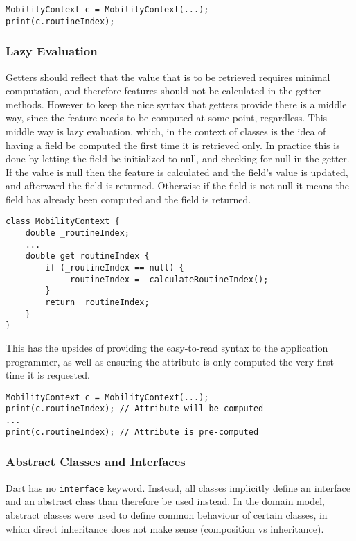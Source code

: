 \begin{verbatim}
MobilityContext c = MobilityContext(...);
print(c.routineIndex);
\end{verbatim}

\subsubsection{Lazy Evaluation}
Getters should reflect that the value that is to be retrieved requires minimal computation, and therefore features should not be calculated in the getter methods. However to keep the nice syntax that getters provide there is a middle way, since the feature needs to be computed at some point, regardless. This middle way is lazy evaluation, which, in the context of classes is the idea of having a field be computed the first time it is retrieved only. In practice this is done by letting the field be initialized to null, and checking for null in the getter. If the value is null then the feature is calculated and the field's value is updated, and afterward the field is returned. Otherwise if the field is not null it means the field has already been computed and the field is returned.

\begin{verbatim}
class MobilityContext {
    double _routineIndex;
    ...
    double get routineIndex {
        if (_routineIndex == null) {
            _routineIndex = _calculateRoutineIndex();
        }
        return _routineIndex;
    }
}
\end{verbatim}

This has the upsides of providing the easy-to-read syntax to the application programmer, as well as ensuring the attribute is only computed the very first time it is requested.

\begin{verbatim}
MobilityContext c = MobilityContext(...);
print(c.routineIndex); // Attribute will be computed
...
print(c.routineIndex); // Attribute is pre-computed
\end{verbatim}

\subsubsection{Abstract Classes and Interfaces}
Dart has no \verb|interface| keyword. Instead, all classes implicitly define an interface and an abstract class than therefore be used instead. In the domain model, abstract classes were used to define common behaviour of certain classes, in which direct inheritance does not make sense (composition vs inheritance). 

